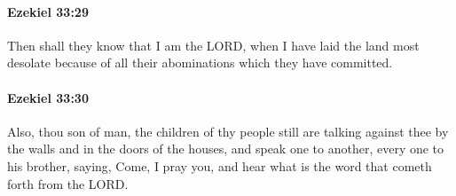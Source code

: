 		\paragraph{Ezekiel 33:29} %
			\label{EZEKIEL-33-29}

			Then shall they know that I am the LORD, when I have laid the land most desolate because of all their abominations which they have committed.


		\paragraph{Ezekiel 33:30} %
			\label{EZEKIEL-33-30}

			Also, thou son of man, the children of thy people still are talking against thee by the walls and in the doors of the houses, and speak one to another, every one to his brother, saying, Come, I pray you, and hear what is the word that cometh forth from the LORD.


